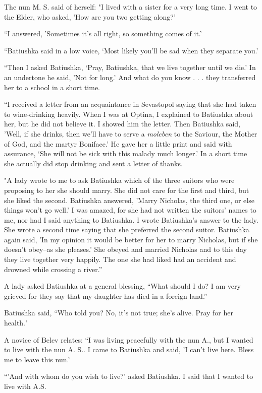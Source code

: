 The nun M. S. said of herself: "I lived with a sister for a very long time. I went to the Elder, who asked, 'How are you two getting along?'

“I answered, 'Sometimes it's all right, so something comes of it.'

“Batiushka said in a low voice, ‘Most likely you'll be sad when they separate you.'

“Then I asked Batiushka, ‘Pray, Batiushka, that we live together until we die.' In an undertone he said, 'Not for long.' And what do you know . . . they transferred her to a school in a short time.

“I received a letter from an acquaintance in Sevastopol saying that she had taken to wine-drinking heavily. When I was at Optina, I explained to Batiushka about her, but he did not believe it. I showed him the letter. Then Batiushka said, 'Well, if she drinks, then we'll have to serve a \textit{moleben} to the Saviour, the Mother of God, and the martyr Boniface.' He gave her a little print and said with assurance, ‘She will not be sick with this malady much longer.' In a short time she actually did stop drinking and sent a letter of thanks.

"A lady wrote to me to ask Batiushka which of the three suitors who were proposing to her she should marry. She did not care for the first and third, but she liked the second. Batiushka answered, 'Marry Nicholas, the third one, or else things won't go well.' I was amazed, for she had not written the suitors' names to me, nor had I said anything to Batiushka. I wrote Batiushka's answer to the lady. She wrote a second time saying that she preferred the second suitor. Batiushka again said, 'In my opinion it would be better for her to marry Nicholas, but if she doesn't obey--as she pleases.' She obeyed and married Nicholas and to this day they live together very happily. The one she had liked had an accident and drowned while crossing a river.”

A lady asked Batiushka at a general blessing, “What should I do? I am very grieved for they say that my daughter has died in a foreign land.”

Batiushka said, “Who told you? No, it's not true; she's alive. Pray for her health."

A novice of Belev relates: “I was living peacefully with the nun A., but I wanted to live with the nun A. S.. I came to Batiushka and said, 'I can't live here. Bless me to leave this nun.'

“'And with whom do you wish to live?' asked Batiushka. I said that I wanted to live with A.S.

